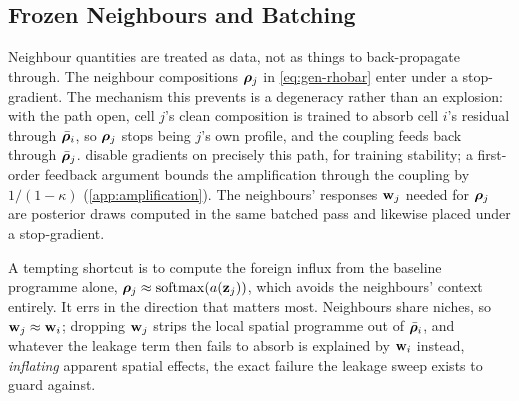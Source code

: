 \subsection{Frozen Neighbours and Batching}
\label{sec:batching}

Neighbour quantities are treated as data, not as things to back-propagate through. The neighbour compositions $\boldsymbol{\rho}_j$ in \cref{eq:gen-rhobar} enter under a stop-gradient. The mechanism this prevents is a degeneracy rather than an explosion: with the path open, cell $j$'s clean composition is trained to absorb cell $i$'s residual through $\bar{\boldsymbol{\rho}}_i$, so $\boldsymbol{\rho}_j$ stops being $j$'s own profile, and the coupling feeds back through $\bar{\boldsymbol{\rho}}_j$. \citet{ergen2025} disable gradients on precisely this path, for training stability; a first-order feedback argument bounds the amplification through the coupling by $1/(1-\kappa)$ (\cref{app:amplification}). The neighbours' responses $\mathbf{w}_j$ needed for $\boldsymbol{\rho}_j$ are posterior draws computed in the same batched pass and likewise placed under a stop-gradient.

 A tempting shortcut is to compute the foreign influx from the baseline programme alone, $\boldsymbol{\rho}_j \approx \operatorname{softmax}(a(\mathbf{z}_j))$, which avoids the neighbours' context entirely. It errs in the direction that matters most. Neighbours share niches, so $\mathbf{w}_j \approx \mathbf{w}_i$; dropping $\mathbf{w}_j$ strips the local spatial programme out of $\bar{\boldsymbol{\rho}}_i$, and whatever the leakage term then fails to absorb is explained by $\mathbf{w}_i$ instead, \emph{inflating} apparent spatial effects, the exact failure the leakage sweep exists to guard against.

